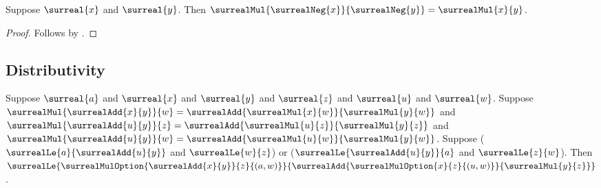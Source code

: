 \begin{corollary}\label{surreal_mul_both_negated}
    Suppose $\surreal{x}$ and $\surreal{y}$.
    Then $\surrealMul{\surrealNeg{x}}{\surrealNeg{y}}
        =\surrealMul{x}{y}$.
\end{corollary}
\begin{proof}
    Follows by
        .
\end{proof}

\subsection{Distributivity}

\begin{lemma}\label{surreal_distributive_option_le_same}
    Suppose $\surreal{a}$ and $\surreal{x}$ and $\surreal{y}$ and
        $\surreal{z}$ and $\surreal{u}$ and $\surreal{w}$.
    Suppose
        $\surrealMul{\surrealAdd{x}{y}}{w}
            =\surrealAdd{\surrealMul{x}{w}}{\surrealMul{y}{w}}$ and
        $\surrealMul{\surrealAdd{u}{y}}{z}
            =\surrealAdd{\surrealMul{u}{z}}{\surrealMul{y}{z}}$ and
        $\surrealMul{\surrealAdd{u}{y}}{w}
            =\surrealAdd{\surrealMul{u}{w}}{\surrealMul{y}{w}}$.
    Suppose
        ($\surrealLe{a}{\surrealAdd{u}{y}}$ and
            $\surrealLe{w}{z}$) or
        ($\surrealLe{\surrealAdd{u}{y}}{a}$ and
            $\surrealLe{z}{w}$).
    Then
        $\surrealLe
            {\surrealMulOption{\surrealAdd{x}{y}}{z}{(a,w)}}
            {\surrealAdd{\surrealMulOption{x}{z}{(u,w)}}
                {\surrealMul{y}{z}}}$.
\end{lemma}
